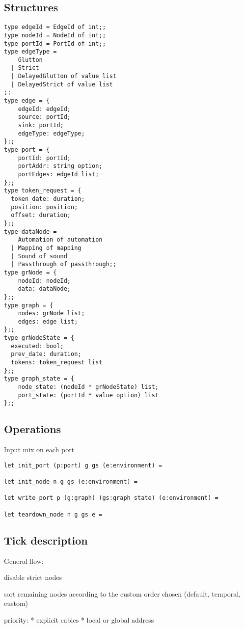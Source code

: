 \documentclass{article}
\begin{document}
\subsection{Structures}
\begin{lstlisting}
type edgeId = EdgeId of int;;
type nodeId = NodeId of int;;
type portId = PortId of int;;
type edgeType =
    Glutton
  | Strict
  | DelayedGlutton of value list
  | DelayedStrict of value list
;;
type edge = {
    edgeId: edgeId;
    source: portId;
    sink: portId;
    edgeType: edgeType;
};;
type port = {
    portId: portId;
    portAddr: string option;
    portEdges: edgeId list;
};;
type token_request = {
  token_date: duration;
  position: position;
  offset: duration;
};;
type dataNode =
    Automation of automation
  | Mapping of mapping
  | Sound of sound
  | Passthrough of passthrough;;
type grNode = {
    nodeId: nodeId;
    data: dataNode;
};;
type graph = {
    nodes: grNode list;
    edges: edge list;
};;
type grNodeState = {
  executed: bool;
  prev_date: duration;
  tokens: token_request list
};;
type graph_state = {
    node_state: (nodeId * grNodeState) list;
    port_state: (portId * value option) list
};;
\end{lstlisting}


\subsection{Operations}
Input mix on each port

\begin{lstlisting}
let init_port (p:port) g gs (e:environment) =

let init_node n g gs (e:environment) =

let write_port p (g:graph) (gs:graph_state) (e:environment) =

let teardown_node n g gs e =
\end{lstlisting}



\subsection{Tick description}

General flow: 

disable strict nodes

sort remaining nodes according to the custom order chosen (default, temporal, custom)

priority: 
* explicit cables
* local or global address
\end{document}
